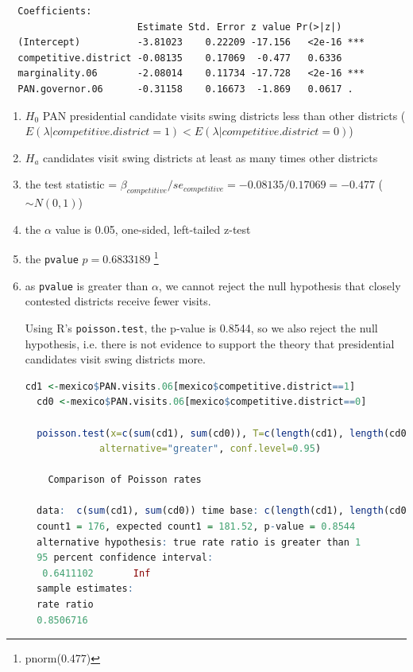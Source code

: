 \documentclass[12pt,letterpaper]{article}
\begin{document}
\begin{enumerate}
\begin{lstlisting}
  Coefficients:
                       Estimate Std. Error z value Pr(>|z|)    
  (Intercept)          -3.81023    0.22209 -17.156   <2e-16 ***
  competitive.district -0.08135    0.17069  -0.477   0.6336    
  marginality.06       -2.08014    0.11734 -17.728   <2e-16 ***
  PAN.governor.06      -0.31158    0.16673  -1.869   0.0617 .  
\end{lstlisting}

	\begin{enumerate}[1.]
		\item $H_0$ PAN presidential candidate visits swing districts less than other districts  ($E(\lambda | competitive.district=1) <E(\lambda | competitive.district=0)$)
		\item $H_a$ candidates visit swing districts at least as many times other districts %
		\item the test statistic = $\beta_{competitive} / se_{competitive} =-0.08135/ 0.17069 = -0.477$ ($\sim N(0,1)$)
		\item the $\alpha$ value is 0.05, one-sided, left-tailed z-test 
		\item the \texttt{pvalue}  $p =  0.6833189 $ \footnote{pnorm(0.477)}
  \item as \texttt{pvalue} is greater than $\alpha$, we cannot reject the null hypothesis that closely contested districts receive fewer visits.

  Using R's \texttt{poisson.test}, the p-value is 0.8544, so we also reject the null hypothesis, i.e. there is not evidence to support the theory that presidential candidates visit swing districts more.
  
  \begin{lstlisting}[language=R]
  cd1 <-mexico$PAN.visits.06[mexico$competitive.district==1]
  cd0 <-mexico$PAN.visits.06[mexico$competitive.district==0]

  poisson.test(x=c(sum(cd1), sum(cd0)), T=c(length(cd1), length(cd0)),
             alternative="greater", conf.level=0.95)

	Comparison of Poisson rates

  data:  c(sum(cd1), sum(cd0)) time base: c(length(cd1), length(cd0))
  count1 = 176, expected count1 = 181.52, p-value = 0.8544
  alternative hypothesis: true rate ratio is greater than 1
  95 percent confidence interval:
   0.6411102       Inf
  sample estimates:
  rate ratio 
  0.8506716 
 \end{lstlisting}

\end{enumerate}
\end{enumerate}
\end{document}
